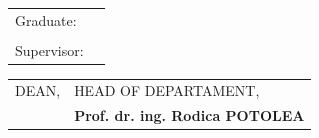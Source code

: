 \pagestyle{fancy}
\setlength{\voffset}{-10pt}
\setlength\headheight{70.0pt}
\renewcommand{\headrulewidth}{0pt}
\cfoot{}
\lfoot{}
\rfoot{}
\begin{center}
	{\department}
	
	\vspace{4cm}
	\makeThesisTitle %
	~\\~\\
	
	\makeThesisType
	
	~\\\vspace{6.5cm}
	
	\begin{tabular}{p{.3\linewidth}p{.5\linewidth}}
		{\hfill Graduate:} & {\bf \thesisauthor} \\
		&\\
		{\parbox[t]{\linewidth}{\hfill Supervisor:}}& {\bf \thesissupervisor}\\
	\end{tabular}
	
	\vspace{3cm}
	{\bf \thesisyear}
\end{center}
\newpage
\begin{center}
	{\department}
\end{center}
\vspace{0.5cm}

\begin{tabular}{p{7cm}p{8cm}}
	\hspace{-1cm}DEAN, & HEAD OF DEPARTAMENT,\\
	\hspace{-1cm}{\bf Prof. dr. ing. Liviu MICLEA} & {\bf Prof. dr. ing. Rodica POTOLEA}\\  
\end{tabular}

